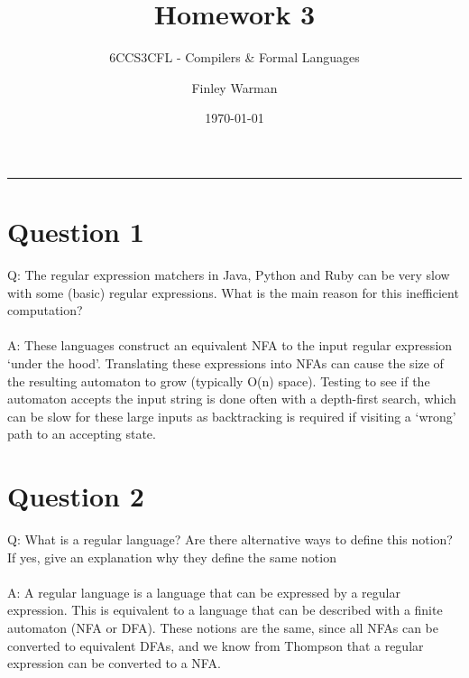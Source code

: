 \documentclass[english]{scrartcl}
\begin{document}


\subtitle{6CCS3CFL - Compilers \& Formal Languages}
\title{Homework 3}
\author{Finley Warman}
\date{\today}

\maketitle


\tableofcontents
\par\noindent\rule{\textwidth}{0.4pt}


\newpage


\section*{Question 1}
Q: The regular expression matchers in Java, Python and Ruby can be very slow with some (basic) regular expressions. What is the main reason for this inefficient computation?
\\
\\
A: These languages construct an equivalent NFA to the input regular expression `under the hood'.
Translating these expressions into NFAs can cause the size of the resulting automaton to grow (typically O(n) space).
Testing to see if the automaton accepts the input string is done often with a depth-first search, which can be slow for these large inputs as
backtracking is required if visiting a `wrong' path to an accepting state.

\section*{Question 2}
Q: What is a regular language? Are there alternative ways to define this notion? If yes, give an explanation why they define the same notion
\\
\\
A: A regular language is a language that can be expressed by a regular expression. This is equivalent to a language that can be described with a finite automaton (NFA or DFA).
These notions are the same, since all NFAs can be converted to equivalent DFAs, and we know from Thompson that a regular expression can be converted to a NFA.
\end{document}

